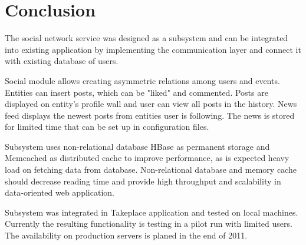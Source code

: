 \documentclass{llncs}
\begin{document}
\section{Conclusion} The social network service was designed as a subsystem
and can be integrated into existing application by implementing the
communication layer and connect it with existing database of users.

Social module allows creating asymmetric relations among users and events.
Entities can insert posts, which can be "liked" and commented. Posts are
displayed on entity's profile wall and user can view all posts in the history.
News feed displays the newest posts from entities user is following.  The news
is stored for limited time that can be set up in configuration files.

Subsystem uses non-relational database HBase as permanent storage and
Memcached as distributed cache to improve performance, as is expected heavy
load on fetching data from database.  Non-relational database and memory cache
should decrease reading time and provide high throughput and scalability in
data-oriented web application.

Subsystem was integrated in Takeplace application and tested on local
machines.  Currently the resulting functionality is testing in a pilot run
with limited users. The availability on production servers is planed in the
end of 2011. 



\end{document}

